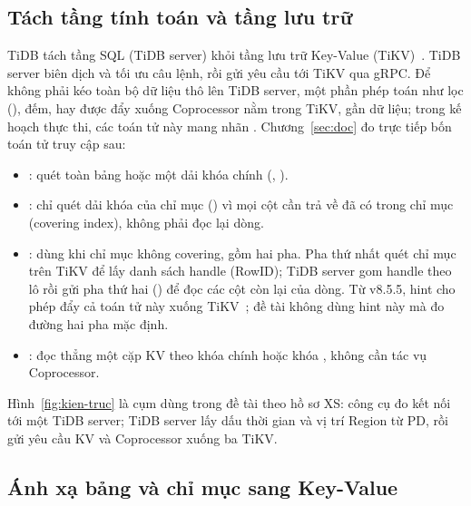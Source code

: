 
\subsection{Tách tầng tính toán và tầng lưu trữ}
TiDB tách tầng SQL (TiDB server) khỏi tầng lưu trữ Key-Value (TiKV)~\cite{pingcap_arch}. TiDB server biên dịch và tối ưu câu lệnh, rồi gửi yêu cầu tới TiKV qua gRPC. Để không phải kéo toàn bộ dữ liệu thô lên TiDB server, một phần phép toán như lọc (), đếm,  hay  được đẩy xuống Coprocessor nằm trong TiKV, gần dữ liệu; trong kế hoạch thực thi, các toán tử này mang nhãn . Chương~\ref{sec:doc} đo trực tiếp bốn toán tử truy cập sau:
\begin{itemize}
  \item {}: quét toàn bảng hoặc một dải khóa chính (, ).
  \item {}: chỉ quét dải khóa của chỉ mục () vì mọi cột cần trả về đã có trong chỉ mục (covering index), không phải đọc lại dòng.
  \item {}: dùng khi chỉ mục không covering, gồm hai pha. Pha thứ nhất quét chỉ mục trên TiKV để lấy danh sách handle (RowID); TiDB server gom handle theo lô rồi gửi pha thứ hai () để đọc các cột còn lại của dòng. Từ v8.5.5, hint  cho phép đẩy cả toán tử này xuống TiKV~\cite{tidb_855}; đề tài không dùng hint này mà đo đường hai pha mặc định.
  \item {}: đọc thẳng một cặp KV theo khóa chính hoặc khóa , không cần tác vụ Coprocessor.
\end{itemize}

Hình~\ref{fig:kien-truc} là cụm dùng trong đề tài theo hồ sơ XS: công cụ đo kết nối tới một TiDB server; TiDB server lấy dấu thời gian và vị trí Region từ PD, rồi gửi yêu cầu KV và Coprocessor xuống ba TiKV.


\subsection{Ánh xạ bảng và chỉ mục sang Key-Value}


